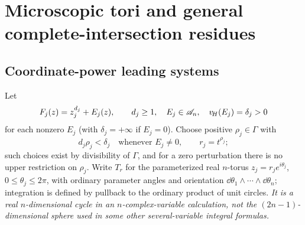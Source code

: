 \documentclass[11pt,letterpaper]{article}
\theoremstyle{definition}
\theoremstyle{remark}
\numberwithin{equation}{section}
\begin{document}
\section{Microscopic tori and general complete-intersection residues}
\label{contours:sec:multi}

\subsection{Coordinate-power leading systems}
Let
\begin{equation}\label{contours:eq:powerleading}
  F_j(z)=z_j^{d_j}+E_j(z),\qquad d_j\ge1,\quad E_j\in\mathscr A_n,\quad v_{\!H}(E_j)=\delta_j>0
\end{equation}
for each nonzero $E_j$ (with $\delta_j=+\infty$ if $E_j=0$). Choose positive
$\rho_j\in\Gamma$ with
\begin{equation}\label{contours:eq:protecting}
  d_j\rho_j<\delta_j\quad\text{whenever }E_j\ne0,
  \qquad r_j=t^{\rho_j} ;
\end{equation}
such choices exist by divisibility of $\Gamma$, and for a zero perturbation there is
no upper restriction on $\rho_j$. Write $T_r$ for the parameterized real $n$-torus
$z_j=r_je^{i\theta_j}$, $0\le\theta_j\le2\pi$, with ordinary parameter angles and
orientation $\dd\theta_1\wedge\cdots\wedge \dd\theta_n$; integration is defined by
pullback to the ordinary product of unit circles. \emph{It is a real
$n$-dimensional cycle in an $n$-complex-variable calculation, not the
$(2n-1)$-dimensional sphere used in some other several-variable integral
formulas.}
\end{document}
